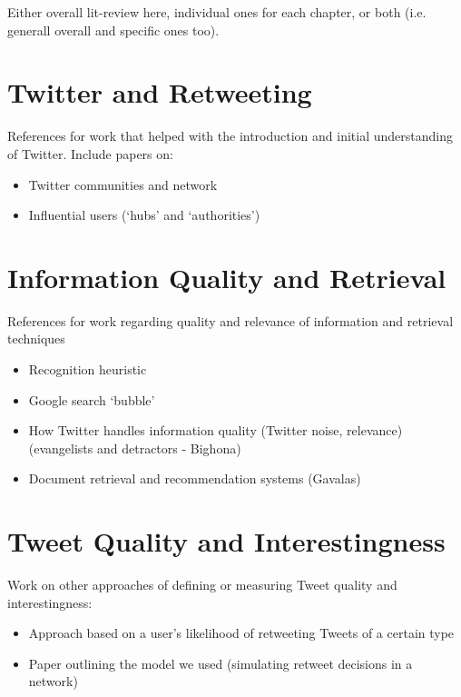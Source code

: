 Either overall lit-review here, individual ones for each chapter, or both (i.e. generall overall and specific ones too).

\section{Twitter and Retweeting}
References for work that helped with the introduction and initial understanding of Twitter. Include papers on:
\begin{itemize}
\item Twitter communities and network
\item Influential users (`hubs' and `authorities')
\end{itemize}

\section{Information Quality and Retrieval}
References for work regarding quality and relevance of information and retrieval techniques
\begin{itemize}
\item Recognition heuristic
\item Google search `bubble'
\item How Twitter handles information quality (Twitter noise, relevance) (evangelists and detractors - Bighona)
\item Document retrieval and recommendation systems (Gavalas)
\end{itemize}

\section{Tweet Quality and Interestingness}
Work on other approaches of defining or measuring Tweet quality and interestingness:
\begin{itemize}
\item Approach based on a user's likelihood of retweeting Tweets of a certain type
\item Paper outlining the model we used (simulating retweet decisions in a network)
\end{itemize}